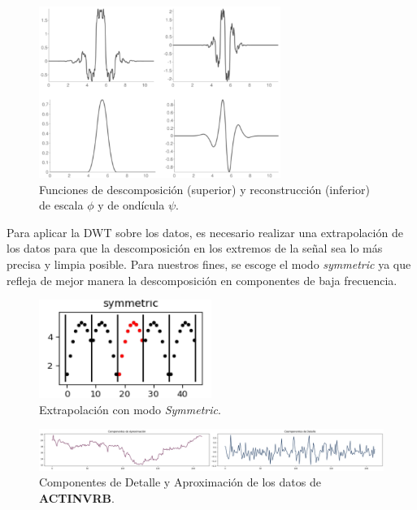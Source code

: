 \begin{figure}[h]
    \centering
    \includegraphics[width=0.7\textwidth]{Figuras/construccion_del_modelo/bior3.5.png}
    \caption{Funciones de descomposición (superior) y reconstrucción (inferior) de escala $\phi$ y de ondícula $\psi$. } 
    \label{fig:bior3_5}
\end{figure}

Para aplicar la DWT sobre los datos, es necesario realizar una extrapolación de los datos para que la descomposición en los extremos de la señal sea lo más precisa y limpia posible. Para nuestros fines, se escoge el modo \textit{symmetric} ya que refleja de mejor manera la descomposición en componentes de baja frecuencia.

\begin{figure}[h]
    \centering
    \includegraphics[width=0.5\textwidth]{Figuras/construccion_del_modelo/symmetric_pad_DWT.png}
    \caption{Extrapolación con modo \textit{Symmetric}.} 
    \label{fig:symmetric_pad}
\end{figure}

\newpage

\begin{figure}[h]
    \centering
    \includegraphics[width=1\textwidth]{Figuras/construccion_del_modelo/ACTINVR_DWT_lvl1.png}
    \caption{Componentes de Detalle y Aproximación de los datos de \textbf{ACTINVRB}.} 
    \label{fig:ACTINVRB_DWT_nivel1}
\end{figure}

